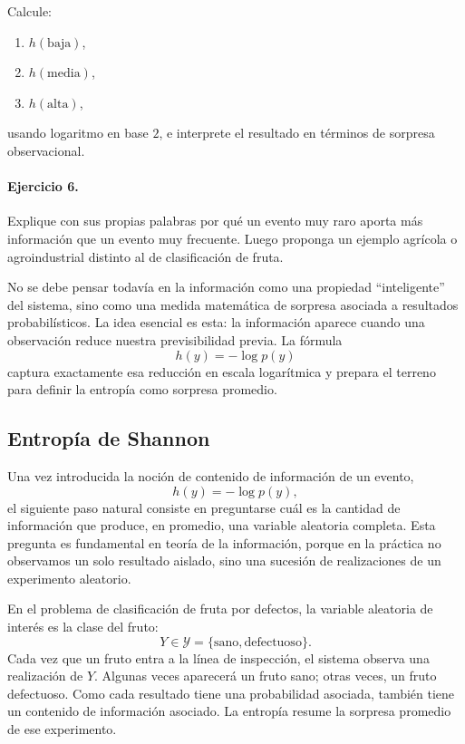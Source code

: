 \documentclass{article}
\begin{document}
Calcule:
\begin{enumerate}
\item \(h(\text{baja})\),
\item \(h(\text{media})\),
\item \(h(\text{alta})\),
\end{enumerate}
usando logaritmo en base \(2\), e interprete el resultado en términos de sorpresa observacional.

\paragraph{Ejercicio 6.}
Explique con sus propias palabras por qué un evento muy raro aporta más información que un evento muy frecuente. Luego proponga un ejemplo agrícola o agroindustrial distinto al de clasificación de fruta.


No se debe pensar todavía en la información como una propiedad ``inteligente'' del sistema, sino como una medida matemática de sorpresa asociada a resultados probabilísticos. La idea esencial es esta: la información aparece cuando una observación reduce nuestra previsibilidad previa. La fórmula
\[
h(y)=-\log p(y)
\]
captura exactamente esa reducción en escala logarítmica y prepara el terreno para definir la entropía como sorpresa promedio.

\subsection{Entropía de Shannon}

Una vez introducida la noción de contenido de información de un evento,
\[
h(y)=-\log p(y),
\]
el siguiente paso natural consiste en preguntarse cuál es la cantidad de información que produce, en promedio, una variable aleatoria completa. Esta pregunta es fundamental en teoría de la información, porque en la práctica no observamos un solo resultado aislado, sino una sucesión de realizaciones de un experimento aleatorio.

En el problema de clasificación de fruta por defectos, la variable aleatoria de interés es la clase del fruto:
\[
Y\in\mathcal{Y}=\{\text{sano},\text{defectuoso}\}.
\]
Cada vez que un fruto entra a la línea de inspección, el sistema observa una realización de \(Y\). Algunas veces aparecerá un fruto sano; otras veces, un fruto defectuoso. Como cada resultado tiene una probabilidad asociada, también tiene un contenido de información asociado. La entropía resume la sorpresa promedio de ese experimento.
\end{document}
